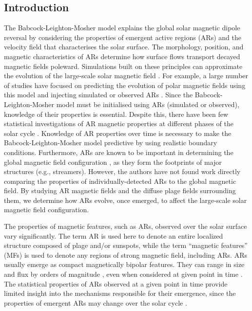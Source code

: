 \documentclass[namedreferences]{solarphysics}
\begin{document}
\begin{article}
\section{Introduction}

The Babcock-Leighton-Mosher model \citep{Babcock:1961,Leighton:1964,Mosher:1977} explains the global solar magnetic dipole reversal by considering the properties of emergent active regions (ARs) and the velocity field that characterises the solar surface. The morphology, position, and magnetic characteristics of ARs determine how surface flows transport decayed magnetic fields poleward. %
Simulations built on these principles can approximate the evolution of the large-scale solar magnetic field \citep{Leighton:1964,Sheeley:1985,Devore:1986,Wang:1989}. For example, a large number of studies have %
 focused on predicting the evolution of polar magnetic fields using this model and injecting simulated or observed ARs \citep{Devore:1987,schussler:2006,Schrijver:2008b,Wang:2009,Upton:2013}. Since the Babcock-Leighton-Mosher model must be initialised using ARs (simulated or observed), knowledge of their properties is essential. Despite this, there have been few statistical investigations of AR magnetic properties at different phases of the solar cycle \citep{meunier:2003,zharkov:2006}. Knowledge of AR properties over time is necessary to make the Babcock-Leighton-Mosher model predictive by using realistic boundary conditions. Furthermore, ARs are known to be important in determining the global magnetic field configuration \citep{wang:2003a, Schrijver:2003, schussler:2006}, as they form the footprints of major structures (e.g., streamers). However, the authors have not found work directly comparing the properties of individually-detected ARs to the global magnetic field. 
By studying AR magnetic fields and the diffuse plage fields surrounding them, we %
determine how ARs evolve, once emerged, to affect the large-scale solar magnetic field configuration. 

The properties of magnetic features, such as ARs, observed over the solar surface vary significantly. The term AR is used here to denote an entire localized structure composed of plage and/or sunspots, while the term ``magnetic features'' (MFs) is used to denote any regions of strong magnetic field, including ARs. ARs usually emerge as compact magnetically bipolar features. They can range in size and flux by orders of magnitude \citep{meunier:2003}, even when considered at given point in time \citep{Parnell:2009}. The statistical properties of ARs observed at a given point in time provide limited insight into the mechanisms responsible for their emergence, since the properties of emergent ARs may change over the solar cycle \citep{meunier:2003,Lefevre:2011}.


\end{article}
\end{document}
